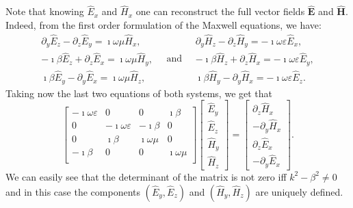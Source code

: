 \documentclass[smallextended]{svjour3}       %
\newcommand{\bfE}{{\mathbf{E}}}
\newcommand{\bfH}{{\mathbf{H}}}
\begin{document}
Note that knowing $\widehat{E}_x$ and $\widehat{H}_x$ one can reconstruct the full vector fields $\widehat{\bfE}$ and $\widehat{\bfH}$. Indeed, from the first order formulation of the Maxwell equations, we have:
\begin{equation}\label{eq:syst-recov}
	\begin{array}{|lll}
		\partial_y \widehat{E}_z - \partial_z \widehat{E}_y = \imath \omega \mu \widehat{H}_x,\\
		-\imath \beta \widehat{E}_z + \partial_z \widehat{E}_x = \imath \omega \mu \widehat{H}_y,\\
		\imath \beta \widehat{E}_y - \partial_y \widehat{E}_x = \imath \omega \mu \widehat{H}_z, 
	\end{array} \quad \text{and} \quad \begin{array}{|lll}
		\partial_y \widehat{H}_z - \partial_z \widehat{H}_y = -\imath \omega \varepsilon \widehat{E}_x,\\
		-\imath \beta \widehat{H}_z + \partial_z \widehat{H}_x = -\imath \omega \varepsilon  \widehat{E}_y,\\
		\imath \beta \widehat{H}_y - \partial_y \widehat{H}_x = -\imath \omega \varepsilon  \widehat{E}_z. 
	\end{array}
\end{equation}
Taking now the last two equations of both systems, we get that
\begin{equation}\label{eq:syst-recov-2}
	\left[ \begin{matrix}
		-\imath \omega \varepsilon  & 0 & 0 & \imath \beta \\
		0 & -\imath \omega \varepsilon  & -\imath \beta & 0 \\ 
		0 & \imath \beta & \imath \omega \mu & 0 \\
		-\imath \beta & 0 & 0 & \imath \omega \mu \\
	\end{matrix} \right] \left[ \begin{matrix}
		\widehat{E}_y \\ \widehat{E}_z \\ \widehat{H}_y \\ \widehat{H}_z
	\end{matrix} \right] = \left[ \begin{matrix} \partial_z \widehat{H}_x \\ - \partial_y \widehat{H}_x \\  \partial_z \widehat{E}_x \\ - \partial_y \widehat{E}_x \end{matrix} \right].
\end{equation}
We can easily see that the determinant of the matrix is not zero iff $k^2 - \beta^2 \neq 0$ and in this case the components $(\widehat{E}_{y},\widehat{E}_{z})$ and $(\widehat{H}_{y},\widehat{H}_{z})$ are uniquely defined. 
\end{document}
